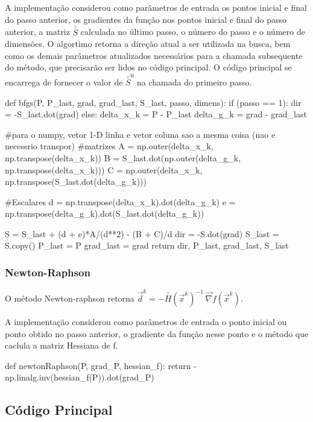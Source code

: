 \documentclass[10pt, a4paper]{article}
\begin{document}
A implementação considerou como parâmetros de entrada os pontos inicial e final do passo anterior,
os gradientes da função nos pontos inicial e final do passo anterior,
a matriz $\bar{\bar{S}}$ calculada no último passo, o número do passo e o número de dimensões.
O algortimo retorna a direção atual a ser utilizada na busca,
bem como os demais parâmetros atualizados necessários para a chamada subsequente do método,
que precisarão ser lidos no código principal.
O código principal se encarrega de fornecer o valor de $\bar{\bar{S}}^0$ na chamada do primeiro passo.

\begin{python}
  def bfgs(P, P_last, grad, grad_last, S_last, passo, dimens):
    if (passo == 1):
        dir = -S_last.dot(grad)
    else:
        delta_x_k = P - P_last
        delta_g_k = grad - grad_last
        
        #para o numpy, vetor 1-D linha e vetor coluna sao a mesma coisa (nao e necessrio transpor)
        #matrizes
        A = np.outer(delta_x_k, np.transpose(delta_x_k))
        B = S_last.dot(np.outer(delta_g_k, np.transpose(delta_x_k)))
        C = np.outer(delta_x_k, np.transpose(S_last.dot(delta_g_k)))
        
        #Escalares        
        d = np.transpose(delta_x_k).dot(delta_g_k)
        e = np.transpose(delta_g_k).dot(S_last.dot(delta_g_k))
                
        S = S_last + (d + e)*A/(d**2) - (B + C)/d
        dir = -S.dot(grad)
        S_last = S.copy()
    P_last = P
    grad_last = grad
    return dir, P_last, grad_last, S_last
\end{python}

\subsubsection{Newton-Raphson}
O método Newton-raphson retorna
$\overrightarrow{d}^k = -\bar{\bar{H}}(\overrightarrow{x}^k)^{-1}\,\overrightarrow{\nabla} f(\overrightarrow{x}^k)$.

A implementação considerou como parâmetros de entrada o ponto inicial ou ponto obtido no passo anterior,
o gradiente da função nesse ponto e o método que caclula a matriz Hessiana de f.

\begin{python}
  def newtonRaphson(P, grad_P, hessian_f):
    return -np.linalg.inv(hessian_f(P)).dot(grad_P)
\end{python}

\subsection{Código Principal}
\end{document}
